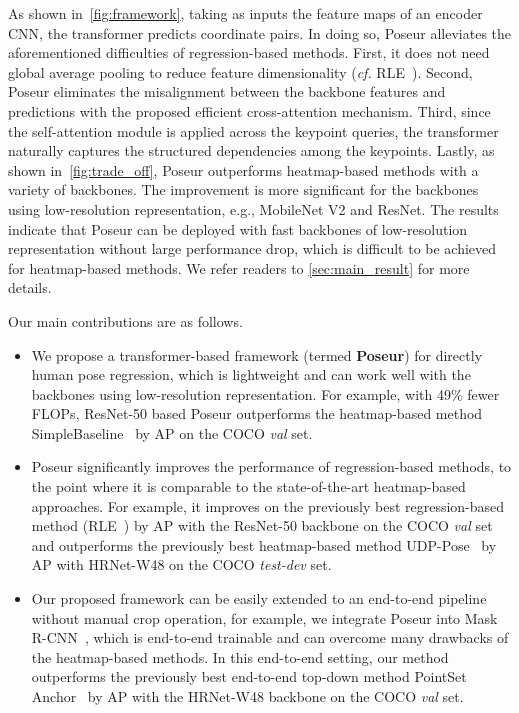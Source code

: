 \documentclass[runningheads]{llncs}
\def\cf{\emph{cf.}\xspace}
\def\handle{{Poseur}\xspace}
\begin{document}
As shown in~\cref{fig:framework}, taking as inputs the feature maps of an encoder CNN, the transformer predicts  coordinate pairs. In doing so, \handle alleviates the aforementioned difficulties of regression-based methods. First, it does not need global average pooling to reduce feature dimensionality (\cf RLE~\cite{li2021rle}). Second, \handle eliminates the misalignment between the backbone features and predictions with the proposed efficient cross-attention mechanism.
Third, since the self-attention module is applied across the keypoint queries, the transformer naturally captures the structured dependencies among the keypoints.
Lastly, as shown in~\cref{fig:trade_off}, \handle outperforms heatmap-based methods with a variety of backbones. The improvement is more significant for the backbones using low-resolution representation, e.g., MobileNet V2 and ResNet. The results indicate that \handle can be deployed with fast backbones of low-resolution representation without large performance drop, which is difficult to be achieved for heatmap-based methods. We refer readers to \cref{sec:main_result} for more details.






Our main contributions are as follows.
\begin{itemize}




\item  We propose a transformer-based framework (termed \textbf{\handle}) for directly human pose regression, which is lightweight and can work well with the backbones using low-resolution representation. For example, with 49\% fewer FLOPs, ResNet-50 based \handle outperforms the heatmap-based method SimpleBaseline~\cite{xiao2018simple} by  AP on the COCO \emph{val} set.
\item \handle significantly improves the performance of regression-based methods, to the point where it is comparable to the state-of-the-art heatmap-based approaches. For example, it improves on the previously best regression-based method (RLE~\cite{li2021rle}) by  AP with the ResNet-50 backbone on the COCO \emph{val} set and outperforms the previously best heatmap-based method UDP-Pose~\cite{sun2019deep} by  AP with HRNet-W48 on the COCO \emph{test-dev} set.
\item Our proposed framework can be easily extended to an end-to-end pipeline without manual crop operation, for example, we integrate \handle into Mask R-CNN~\cite{he2017mask}, which is end-to-end trainable and can overcome many drawbacks of the heatmap-based methods. In this end-to-end setting, our method outperforms the previously best end-to-end top-down method PointSet Anchor~\cite{wei2020point} by  AP with the HRNet-W48 backbone on the COCO \emph{val} set.




\end{itemize}
\end{document}
